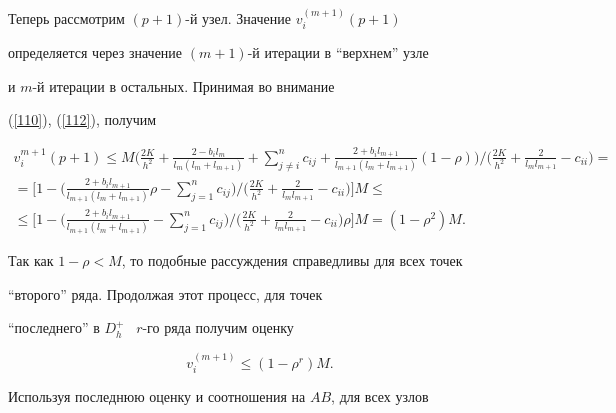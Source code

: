 \begin{pf}
Теперь рассмотрим $(p+1)$-й узел. Значение $v_i^{(m+1)}(p+1)$


определяется через значение $(m+1)$-й итерации в ``верхнем'' узле


и $m$-й итерации в остальных. Принимая во внимание


(\ref{110}), (\ref{112}), получим


\begin{gather*}


v_{i}^{m+1}(p+1) \leq M\bigg(\frac{2K}{h^2}


+ \frac{2 - b_il_{m}}{l_{m}(l_m + l_{m+1})} + \sum\limits_{j\ne i}^n


c_{ij} + \frac{2+b_il_{m+1}}{l_{m+1}(l_m + l_{m+1})}(1-\rho)\bigg)\bigg/ 


\bigg (\frac{2K}{h^2} + \frac{2}{l_ml_{m+1}} - c_{ii} \bigg)= \\


%


= \bigg[1 - \bigg(


\frac{2 + b_il_{m+1}}{l_{m+1}(l_m + l_{m+1})}\rho - \sum\limits_{j=1}^n


c_{ij} \bigg) \bigg/


\bigg(\frac{2K}{h^2} + \frac{2}{l_ml_{m+1}} - c_{ii} \bigg)\bigg]M\le \\


%


\leq\bigg[1 - \bigg(


\frac{2 + b_il_{m+1}}{l_{m+1}(l_m + l_{m+1})} - \sum\limits_{j=1}^n


c_{ij} \bigg) \bigg/


\bigg(\frac{2K}{h^2} + \frac{2}{l_ml_{m+1}} - c_{ii} \bigg)\rho


\bigg]M= (1-\rho^2)M.


\end{gather*}





Так как $1-\rho<M$, то подобные рассуждения справедливы для всех точек


``второго'' ряда. Продолжая этот процесс, для точек 


``последнего'' в $D_h^+$ \ $r$-го ряда получим оценку


$$


v_{i}^{(m+1)} \leq (1 - \rho^r)M.


$$





Используя последнюю оценку и соотношения на $AB$, для всех узлов



\end{pf}
